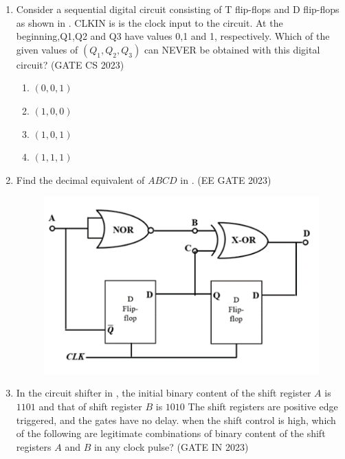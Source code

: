 \begin{enumerate}[label=\arabic*.,ref=\theenumi]
\begin{figure}[H]
{
	}
    \caption{}
	\label{fig:GATE EC 2023}
\end{figure}
%
\item 
Consider a sequential digital circuit consisting of T flip-flops and D flip-flops as shown in 
.
 CLKIN is is the clock input to the circuit. At the beginning,Q1,Q2 and Q3 have values 0,1 and 1, respectively.
Which of the given values of \((Q_1, Q_2, Q_3)\) can NEVER be obtained with this digital circuit?
\hfill(GATE CS 2023)
\begin{enumerate}
    \item ${(0,0,1)}$
    \item ${(1,0,0)}$
    \item ${(1,0,1)}$
    \item ${(1,1,1)}$
\end{enumerate}
%
	\begin{figure}[H]
    \centering
    \resizebox{0.75\columnwidth}{!}{%

		}
\caption{}
\label{fig:Flip-Flop}
\end{figure}
%
\item Find the decimal equivalent of $ABCD$
	in
.
\hfill{(EE GATE 2023)}\\
%
\begin{figure}[H]
 \centering
\includegraphics[width=0.5\columnwidth]{ide/7474/figs/Gate_question.png}
\caption{}
\label{fig:Gate_question.png}
\end{figure}
\item In the circuit shifter in 
,
the initial binary content of the shift register $A$ is $1101$ and that of shift register $B$ is $1010$ The shift registers are positive edge triggered, and the gates have no delay.
when the shift control is high, which of the following are legitimate combinations of binary content of the shift registers $A$ and $B$ in any clock pulse?
\hfill{(GATE IN 2023)}

\end{enumerate}
